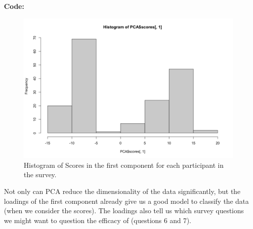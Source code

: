 \documentclass[12pt]{article}
\makeatletter
\theoremstyle{homework}
\newenvironment{exercise}[1]
{\def\@currentlabel{#1}\exercisecore}
{\endexercisecore}
\makeatother
\begin{document}
\begin{exercise}{4}
  \textbf{Code:}
  \begin{center}
  
  \end{center} 
  \begin{figure}[H]
    \begin{center}
      \caption{Histogram of Scores in the first component for each participant in the survey.}
    \includegraphics[width = \textwidth]{Rplot04.png}
    \end{center}
  \end{figure}
\end{exercise}

Not only can PCA reduce the dimensionality of the data significantly, but the loadings of the first component already give us a good model 
to classify the data (when we consider the scores). The loadings also tell us which survey questions we might want to question the efficacy of (questions 6 and 7). 
\end{document}
